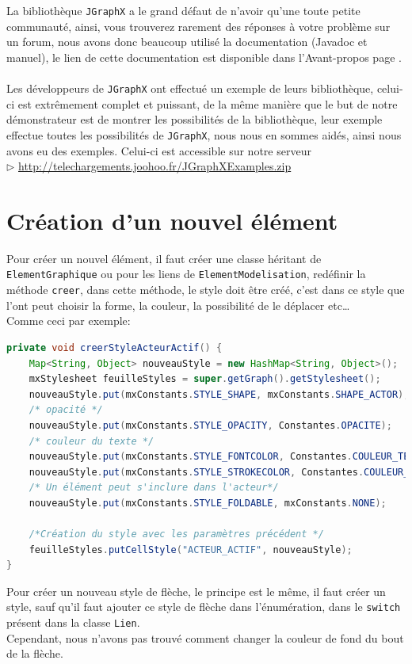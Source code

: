 \documentclass[12pt,a4paper,oneside]{book}
\begin{document}
	La bibliothèque \texttt{JGraphX} a le grand défaut de n'avoir qu'une toute petite communauté, ainsi, vous trouverez rarement des réponses à votre problème
	sur un forum, nous avons donc beaucoup utilisé la documentation (Javadoc et manuel), le lien de cette documentation est disponible dans l'Avant-propos page \pageref{docDemonstrateur}.

	\paragraph{}	
	Les développeurs de \texttt{JGraphX} ont effectué un exemple de leurs bibliothèque, celui-ci est extrêmement complet et puissant, de la même manière que le but de notre démonstrateur est de montrer
	les possibilités de la bibliothèque, leur exemple effectue toutes les possibilités de \texttt{JGraphX}, nous nous en sommes aidés, ainsi nous avons eu des exemples. 
	Celui-ci est accessible sur notre serveur\\
	$\rhd$ \url{http://telechargements.joohoo.fr/JGraphXExamples.zip}\\ 

	\section{Création d'un nouvel élément}\label{style}
	Pour créer un nouvel élément, il faut créer une classe héritant de \texttt{ElementGraphique} ou pour les liens de \texttt{ElementModelisation}, redéfinir la méthode \texttt{creer}, dans cette méthode, le style doit être créé, c'est dans ce style que l'ont peut choisir la forme, la couleur, la possibilité de le déplacer etc\ldots \\
	Comme ceci par exemple:
	\begin{lstlisting}[language=Java, caption=Création du style de l'acteur actif]
private void creerStyleActeurActif() {
	Map<String, Object> nouveauStyle = new HashMap<String, Object>();
	mxStylesheet feuilleStyles = super.getGraph().getStylesheet();
	nouveauStyle.put(mxConstants.STYLE_SHAPE, mxConstants.SHAPE_ACTOR); 
	/* opacité */
	nouveauStyle.put(mxConstants.STYLE_OPACITY, Constantes.OPACITE);
	/* couleur du texte */
	nouveauStyle.put(mxConstants.STYLE_FONTCOLOR, Constantes.COULEUR_TEXTE); 
	nouveauStyle.put(mxConstants.STYLE_STROKECOLOR, Constantes.COULEUR_BORDURE); //Couleur de la bordure
	/* Un élément peut s'inclure dans l'acteur*/
	nouveauStyle.put(mxConstants.STYLE_FOLDABLE, mxConstants.NONE); 
	
	/*Création du style avec les paramètres précédent */
	feuilleStyles.putCellStyle("ACTEUR_ACTIF", nouveauStyle); 
}
\end{lstlisting}
Pour créer un nouveau style de flèche, le principe est le même, il faut créer un style, sauf qu'il faut ajouter ce style de flèche dans l'énumération, dans
le \texttt{switch} présent dans la classe \texttt{Lien}.\\
Cependant, nous n'avons pas trouvé comment changer la couleur de fond du bout de la flèche.
	
\end{document}
